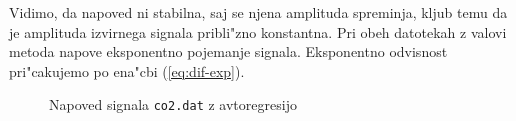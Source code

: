 \documentclass[a4paper,10pt]{article}
\begin{document}
Vidimo, da napoved ni stabilna, saj se njena amplituda spreminja, kljub temu da je amplituda izvirnega signala pribli"zno konstantna. Pri obeh datotekah z valovi metoda napove eksponentno pojemanje signala. Eksponentno odvisnost pri"cakujemo po ena"cbi (\ref{eq:dif-exp}). 

\begin{figure}[h]
 
 \caption{Napoved signala \texttt{co2.dat} z avtoregresijo}
 \label{fig:napoved-co2}
\end{figure}

 
\end{document}
